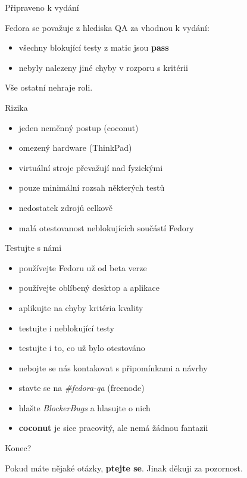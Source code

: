 \documentclass[12pt,aspectratio=169]{beamer}
\begin{document}
\begin{frame}{Připraveno k vydání}
	
	Fedora se považuje z hlediska QA za vhodnou k vydání:
	
	\vspace{10pt}
	
	\begin{itemize}
		\item všechny blokující testy z matic jsou \textbf{pass}
		\item nebyly nalezeny jiné chyby v rozporu s kritérii
	\end{itemize}

	\vspace{10pt}

	Vše ostatní nehraje roli.
\end{frame}

\begin{frame}{Rizika}
	
	\begin{itemize}
		\item jeden neměnný postup (coconut)
		\item omezený hardware (ThinkPad)
		\item virtuální stroje převažují nad fyzickými
		\item pouze minimální rozsah některých testů
		\item nedostatek zdrojů celkově
		\item malá otestovanost neblokujících součástí Fedory
	\end{itemize}
\end{frame}

\begin{frame}{Testujte s námi}
	
	\begin{itemize}
		\item používejte Fedoru už od beta verze
		\item používejte oblíbený desktop a aplikace
		\item aplikujte na chyby kritéria kvality
		\item testujte i neblokující testy
		\item testujte i to, co už bylo otestováno
		\item nebojte se nás kontakovat s připomínkami a návrhy
		\item stavte se na \textit{\#fedora-qa} (freenode)
		\item hlašte \textit{BlockerBugs} a hlasujte o nich
		\item \textbf{coconut} je sice pracovitý, ale nemá žádnou fantazii
	\end{itemize}
\end{frame}

\begin{frame}{Konec?}

Pokud máte nějaké otázky, \textbf{ptejte se}. Jinak děkuji za pozornost.

\end{frame}
\end{document}
